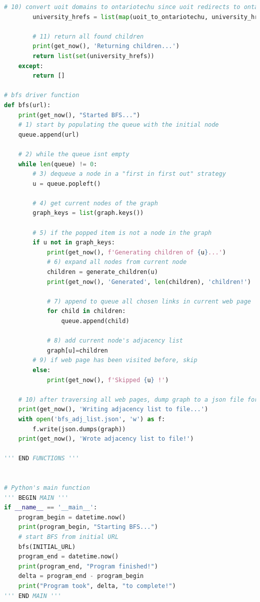\begin{lstlisting}[language=Python]
        # 10) convert uoit domains to ontariotechu since uoit redirects to ontariotech
        university_hrefs = list(map(uoit_to_ontariotechu, university_hrefs))

        # 11) return all found children
        print(get_now(), 'Returning children...')
        return list(set(university_hrefs))
    except:
        return []

# bfs driver function
def bfs(url):
    print(get_now(), "Started BFS...")
    # 1) start by populating the queue with the initial node
    queue.append(url)

    # 2) while the queue isnt empty
    while len(queue) != 0:
        # 3) dequeue a node in a "first in first out" strategy
        u = queue.popleft()

        # 4) get current nodes of the graph
        graph_keys = list(graph.keys())

        # 5) if the popped item is not a node in the graph
        if u not in graph_keys:
            print(get_now(), f'Generating children of {u}...')
            # 6) expand all nodes from current node
            children = generate_children(u)
            print(get_now(), 'Generated', len(children), 'children!')

            # 7) append to queue all chosen links in current web page
            for child in children:
                queue.append(child)
            
            # 8) add current node's adjacency list
            graph[u]=children
        # 9) if web page has been visited before, skip
        else:
            print(get_now(), f'Skipped {u} !')

    # 10) after traversing all web pages, dump graph to a json file for posterior processing and analytics
    print(get_now(), 'Writing adjacency list to file...')
    with open('bfs_adj_list.json', 'w') as f:
        f.write(json.dumps(graph))
    print(get_now(), 'Wrote adjacency list to file!')

''' END FUNCTIONS '''


# Python's main function
''' BEGIN MAIN '''
if __name__ == '__main__':
    program_begin = datetime.now()
    print(program_begin, "Starting BFS...")
    # start BFS from initial URL
    bfs(INITIAL_URL)
    program_end = datetime.now()
    print(program_end, "Program finished!")
    delta = program_end - program_begin
    print("Program took", delta, "to complete!")
''' END MAIN '''
\end{lstlisting}

